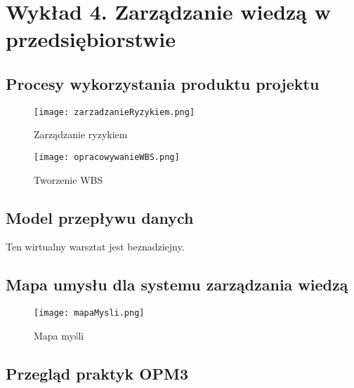 \chapter{Wykład 4. Zarządzanie wiedzą w przedsiębiorstwie}

\section{Procesy wykorzystania produktu projektu}

\begin{figure}[!h]
\centering
\texttt{[image: zarzadzanieRyzykiem.png]}
\caption{Zarządzanie ryzykiem}
\label{fig:zarzadzanieRyzykiem}
\end{figure}

\clearpage

\begin{figure}[!h]
\centering
\texttt{[image: opracowywanieWBS.png]}
\caption{Tworzenie WBS}
\label{fig:opracowanieWBS}
\end{figure}



\section{Model przepływu danych}

Ten wirtualny warsztat jest beznadziejny.


\section{Mapa umysłu dla systemu zarządzania wiedzą}

\begin{figure}[!h]
\centering
\texttt{[image: mapaMysli.png]}
\caption{Mapa myśli}
\label{fig:mapaMysli}
\end{figure}

\clearpage


\section{Przegląd praktyk OPM3}

